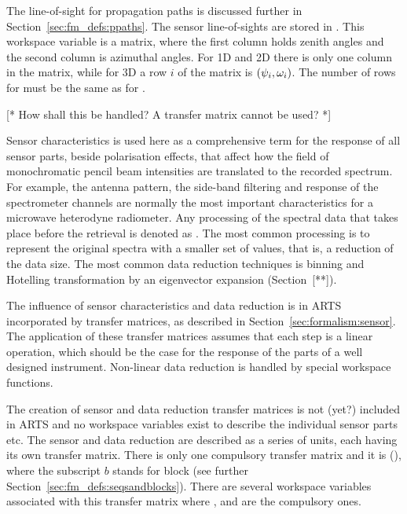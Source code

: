 The line-of-sight for propagation paths is discussed further in
Section~\ref{sec:fm_defs:ppaths}. The sensor line-of-sights are stored in
. This workspace variable is a matrix, where the
first column holds zenith angles and the second column is azimuthal
angles. For 1D and 2D there is only one column in the matrix, while
for 3D a row $i$ of the matrix is $(\psi_{i},\omega_{i})$. The
number of rows for  must be the same as for
.


\label{sec:fm_defs:sensorpol}

[* How shall this be handled? A transfer matrix cannot be used?
 *]


\label{sec:fm_defs:sensorchar}

Sensor characteristics is used here as a
comprehensive term for the response of all sensor parts, beside
polarisation effects, that affect how the field of monochromatic
pencil beam intensities are translated to the recorded spectrum. For
example, the antenna pattern, the side-band filtering and response of
the spectrometer channels are normally the most important
characteristics for a microwave heterodyne radiometer. Any processing
of the spectral data that takes place before the retrieval is denoted
as . The most common processing is to represent
the original spectra with a smaller set of values, that is, a
reduction of the data size. The most common data reduction techniques
is binning and Hotelling transformation by an eigenvector expansion
(Section~[**]).

The influence of sensor characteristics and data reduction is in ARTS
incorporated by transfer matrices, as
described in Section~\ref{sec:formalism:sensor}. The application of
these transfer matrices assumes that each step is a linear operation,
which should be the case for the response of the parts of a well
designed instrument. Non-linear data reduction is handled by special
workspace functions.

The creation of sensor and data reduction transfer matrices is not
(yet?) included in ARTS and no workspace variables exist to describe
the individual sensor parts etc. The sensor and data reduction are
described as a series of units, each having its own transfer matrix.
There is only one compulsory transfer matrix and it is 
(), where the subscript $b$ stands for block (see further
Section~\ref{sec:fm_defs:seqsandblocks}). There are several workspace
variables associated with this transfer matrix where
,  and
 are the compulsory ones.

